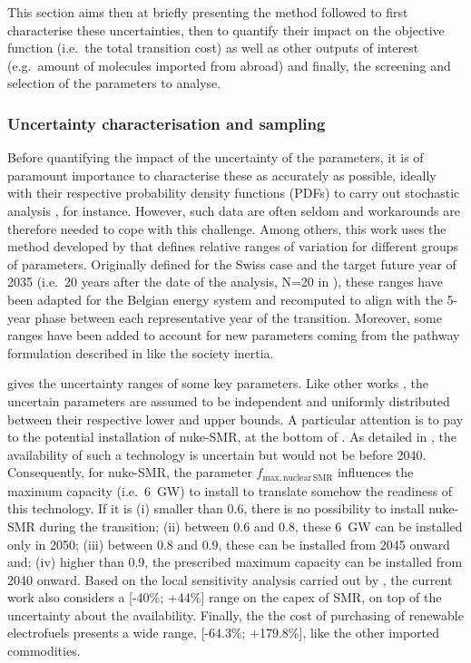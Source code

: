 \documentclass[11pt,twoside,a4paper,english]{article}
\def\eg{e.g.\ }
\def\ie{i.e.\ }
\begin{document}
This section aims then at briefly presenting the method followed to first characterise these uncertainties, then to quantify their impact on the objective function (\ie the total transition cost) as well as other outputs of interest (\eg amount of molecules imported from abroad) and finally, the screening and selection of the parameters to analyse.

\subsubsection{Uncertainty characterisation and sampling}
\label{subsubsec:UQ:UC}
Before quantifying the impact of the uncertainty of the parameters, it is of paramount importance to characterise these as accurately as possible, ideally with their respective probability density functions (PDFs) to carry out stochastic analysis \cite{dantzig1955linear}, for instance. However, such data are often seldom \cite{marnay2006addressing} and workarounds are therefore needed to cope with this challenge. Among others, this work uses the method developed by \citet{Moret2017} that defines relative ranges of variation for different groups of parameters. Originally defined for the Swiss case and the target future year of 2035 (\ie 20 years after the date of the analysis, N=20 in \cite{Moret2017}), these ranges have been adapted for the Belgian energy system and recomputed to align with the 5-year phase between each representative year of the transition. Moreover, some ranges have been added to account for new parameters coming from the pathway formulation described in  like the society inertia.

 gives the uncertainty ranges of some key parameters. Like other works \cite{li2019renewables,coppitters2021robust}, the uncertain parameters are assumed to be independent and uniformly distributed between their respective lower and upper bounds. A particular attention is to pay to the potential installation of \gls{nuke-SMR}, at the bottom of . As detailed in , the availability of such a technology is uncertain but would not be before 2040. Consequently, for \gls{nuke-SMR}, the parameter $f_{\mathrm{max,nuclear\,SMR}}$ influences the maximum capacity (\ie 6~GW) to install to translate somehow the readiness of this technology. If it is (i) smaller than 0.6, there is no possibility to install nuke-SMR during the transition; (ii) between 0.6 and 0.8, these 6~GW can be installed only in 2050; (iii) between 0.8 and 0.9, these can be installed from 2045 onward and; (iv) higher than 0.9, the prescribed maximum capacity can be installed from 2040 onward. Based on the local sensitivity analysis carried out by \citet{PATHS2050}, the current work also considers a [-40\%; +44\%] range on the capex of SMR, on top of the uncertainty about the availability. Finally, the the cost of purchasing of renewable electrofuels presents a wide range, [-64.3\%; +179.8\%], like the other imported commodities.
\end{document}
